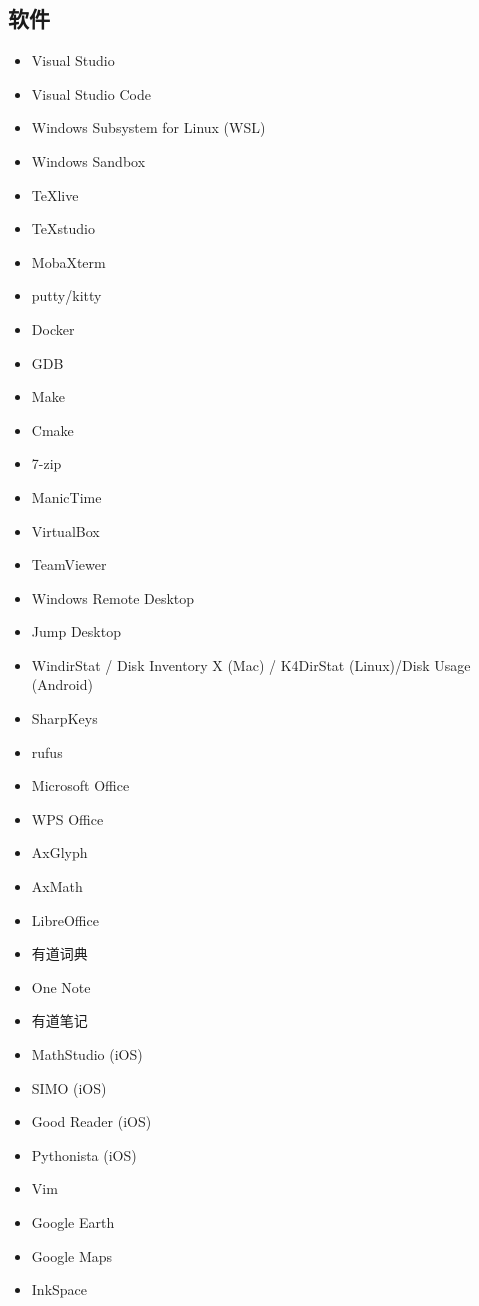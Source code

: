 \subsection{软件}
\begin{itemize}
\item Visual Studio
\item Visual Studio Code
\item Windows Subsystem for Linux (WSL)
\item Windows Sandbox
\item TeXlive
\item TeXstudio
\item MobaXterm
\item putty/kitty
\item Docker
\item GDB
\item Make
\item Cmake
\item 7-zip
\item ManicTime
\item VirtualBox
\item TeamViewer
\item Windows Remote Desktop
\item Jump Desktop
\item WindirStat / Disk Inventory X (Mac) / K4DirStat (Linux)/Disk Usage (Android)
\item SharpKeys
\item rufus
\item Microsoft Office
\item WPS Office
\item AxGlyph
\item AxMath
\item LibreOffice
\item 有道词典
\item One Note
\item 有道笔记
\item MathStudio (iOS)
\item SIMO (iOS)
\item Good Reader (iOS)
\item Pythonista (iOS)
\item Vim
\item Google Earth
\item Google Maps
\item InkSpace
\end{itemize}

